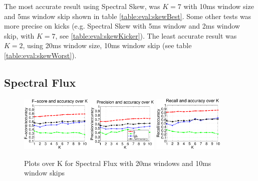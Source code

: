 		The most accurate result using Spectral Skew, was $K=7$ with 10ms window size and 5ms window skip shown in table \ref{table:eval:skewBest}. Some other tests was more precise on kicks (e.g. Spectral Skew with 5ms window and 2ms window skip, with $K=7$, see \ref{table:eval:skewKicker}). The least accurate result was $K=2$, using 20ms window size, 10ms window skip (see table \ref{table:eval:skewWorst}).
	
	\subsection{Spectral Flux}
		
		\begin{figure}
		
		
			\centering\includegraphics[width=0.3\textwidth]{tex/appendices/test/sflux2010FP.png}
			\centering\includegraphics[width=0.3\textwidth]{tex/appendices/test/sflux2010_P.png}
			\centering\includegraphics[width=0.3\textwidth]{tex/appendices/test/sflux2010_R.png}
			
			\caption{Plots over K for Spectral Flux with 20ms windows and 10ms window skips}
		\end{figure}
